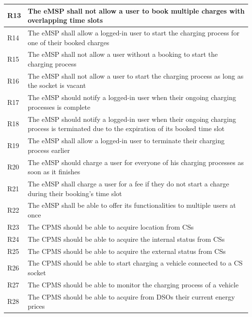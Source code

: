 \documentclass[11pt]{article}
\begin{document}
\begin{table}[H]
\begin{tabularx}{\textwidth}{|>{\centering\hsize=0.1\hsize}X|>{\hsize=1.9\hsize}X|}
        \hline
        R13 & The eMSP shall not allow a user to book multiple charges with overlapping time slots \\
        \hline
        R14 & The eMSP shall allow a logged-in user to start the charging process for one of their booked charges \\
        \hline
        R15 & The eMSP shall not allow a user without a booking to start the charging process \\
        \hline
        R16 & The eMSP shall not allow a user to start the charging process as long as the socket is vacant \\
        \hline
        R17 & The eMSP should notify a logged-in user when their ongoing charging processes is complete \\
        \hline
        R18 & The eMSP should notify a logged-in user when their ongoing charging process is terminated due to the expiration of its booked time slot \\
        \hline
        R19 & The eMSP shall allow a logged-in user to terminate their charging process earlier \\
        \hline
        R20 & The eMSP should charge a user for everyone of his charging processes as soon as it finishes \\
        \hline
        R21 & The eMSP shall charge a user for a fee if they do not start a charge during their booking's time slot \\
        \hline
        R22 & The eMSP shall be able to offer its functionalities to multiple users at once \\
        \hline
        R23 & The CPMS should be able to acquire location from CSs \\
        \hline
        R24 & The CPMS should be able to acquire the internal status from CSs \\
        \hline
        R25 & The CPMS should be able to acquire the external status from CSs \\
        \hline
        R26 & The CPMS should be able to start charging a vehicle connected to a CS socket \\
        \hline
        R27 & The CPMS should be able to monitor the charging process of a vehicle \\
        \hline
        R28 & The CPMS should be able to acquire from DSOs their current energy prices \\
        \hline
    \end{tabularx}
    \label{tab:requirements}
\end{table}
\end{document}
